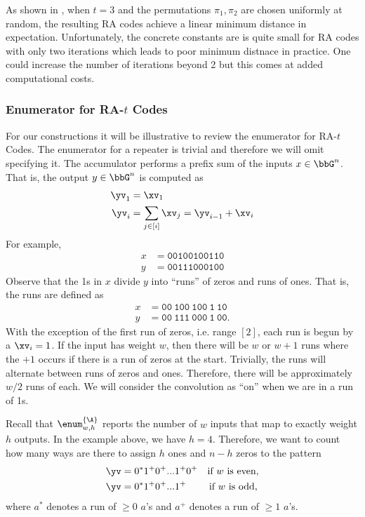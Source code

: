 \noindent As shown in \cite{spielman}, when $t=3$ and the permutations $\pi_1,\pi_2$ are chosen uniformly at random, the resulting RA codes achieve a linear minimum distance in expectation. Unfortunately, the concrete constants are is quite small for RA codes with only two iterations which leads to poor minimum distnace in practice. One could increase the number of iterations beyond 2 but this comes at added computational costs.

\subsubsection{Enumerator for RA-$t$ Codes}

For our constructions it will be illustrative to review the enumerator for RA-$t$ Codes.
The enumerator for a repeater is trivial and therefore we will omit specifying it.
The accumulator performs a prefix sum of the inputs $x\in \bbG^n$. That is, the output $y\in \bbG^n$ is computed as
\begin{align*}
  \yv_1&=\xv_1\\
  \yv_i&=\sum_{j\in[i]}\xv_j = \yv_{i-1}+\xv_i
\end{align*}
For example,
\begin{align*}
  x&=\mathtt{00100100110}\\
  y&=\mathtt{00111000100}
\end{align*}
Observe that the 1s in $x$ divide $y$ into ``runs'' of zeros and runs of ones. That is, the runs are defined as
\begin{align*}
  x&=\mathtt{00\ 100\ 100\ 1\ 10}\\
  y&=\mathtt{00\ 111\ 000\ 1\ 00}.
\end{align*}
With the exception of the first run of zeros, i.e. range $[2]$, each run is begun by a $\xv_i=1$. If the input has weight $w$, then there will be $w$ or $w+1$ runs where the $+1$ occurs if there is a run of zeros at the start. Trivially, the runs will alternate between runs of zeros and ones. Therefore, there will be approximately $w/2$ runs of each. We will consider the convolution as ``on'' when we are in a run of 1s.

Recall that $\enum^{\{\A\}}_{w,h}$ reports the number of $w$ inputs that map to exactly weight $h$ outputs. In the example above, we have $h=4$. Therefore, we want to count how many ways are there to assign $h$ ones and $n-h$ zeros to the pattern
\begin{align*}
  \yv=0^*1^+0^+&...1^+0^+ \quad\text{if $w$ is even,}\\
  \yv=0^*1^+0^+&...1^+ \qquad\ \text{if $w$ is odd,}
\end{align*}
where $a^*$ denotes a run of $\geq 0$ $a$'s and $a^+$ denotes a run of $\geq 1$ $a$'s.

